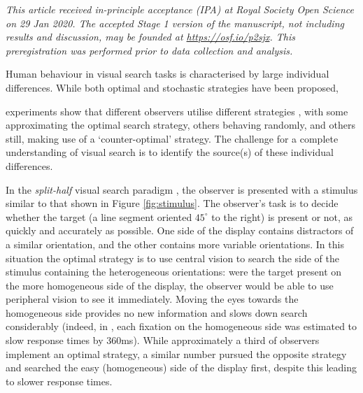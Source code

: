 \documentclass[]{rsos}
\begin{document}
\begin{fmtext}
\end{fmtext}
\maketitle

\textit{This article received in-principle acceptance (IPA) at Royal Society Open Science on 29 Jan 2020. The accepted Stage 1 version of the manuscript, not including results and discussion, may be founded at \url{https://osf.io/p2sjx}. This preregistration was performed prior to data collection and analysis.}

Human behaviour in visual search tasks is characterised by large individual differences. While both optimal \cite{najemnik-geisler2008,hoppe-rothkopf2019} and stochastic \cite{clarke2016} strategies have been proposed, 

experiments show that different observers utilise different strategies \cite{nowakowska2017,irons-leber2016}, with some approximating the optimal search strategy, others behaving randomly, and others still, making use of a `counter-optimal' strategy. The challenge for a complete understanding of visual search is to identify the source(s) of these individual differences.


In the \textit{split-half} visual search paradigm \cite{nowakowska2017}, the observer is presented with a stimulus similar to that shown in Figure \ref{fig:stimulus}. The observer's task is to decide whether the target (a line segment oriented $45^{\circ}$ to the right) is present or not, as quickly and accurately as possible. One side of the display contains distractors of a similar orientation, and the other contains more variable orientations. In this situation the optimal strategy is to use central vision to search the side of the stimulus containing the heterogeneous orientations: were the target present on the more homogeneous side of the display, the observer would be able to use peripheral vision to see it immediately. Moving the eyes towards the homogeneous side provides no new information and slows down search considerably (indeed, in \cite{nowakowska2016}, each fixation on the homogeneous side was estimated to slow response times by 360ms). While approximately a third of observers implement an optimal strategy, a similar number pursued the opposite strategy and searched the easy (homogeneous) side of the display first, despite this leading to slower response times.
\end{document}
